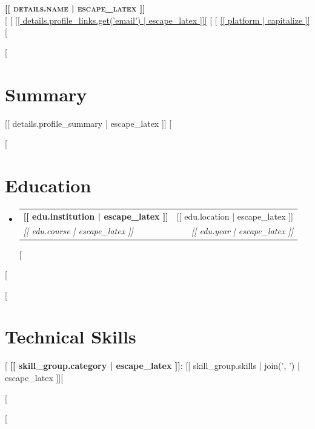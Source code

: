\documentclass[letterpaper,11pt]{article}
\makeatletter
\newcommand{\resumeSubheading}[4]{
  \vspace{-1pt}\item
    \begin{tabular*}{0.97\textwidth}{l@{\extracolsep{\fill}}r}
      \textbf{#1} & #2 \\
      \textit{\small#3} & \textit{\small #4} \\
    \end{tabular*}\vspace{-5pt}
}
\newcommand{\resumeSubHeadingListStart}{\begin{itemize}[leftmargin=*]}
\newcommand{\resumeSubHeadingListEnd}{\end{itemize}}
\makeatother
\begin{document}
\begin{center}
  \textbf{\Huge \scshape [[ details.name | escape_latex ]]} \\ \vspace{1pt}
  \small
  [%
  [%
  \href{mailto:[[ details.profile_links.get('email') ]]}{\underline{[[ details.profile_links.get('email') | escape_latex ]]}}[%
  [%
  [%
  \href{[% if url.startswith('http') %][[ url ]][% else %]https://[[ url ]][% endif %]}{\underline{[[ platform | capitalize ]]}}[%
\end{center}

[%
\section{Summary}
\small [[ details.profile_summary | escape_latex ]]
[%

[%
\section{Education}
  \resumeSubHeadingListStart
    [%
    \resumeSubheading
      {[[ edu.institution | escape_latex ]]}{[[ edu.location | escape_latex ]]}
      {[[ edu.course | escape_latex ]]}{[[ edu.year | escape_latex ]]}
    [%
  \resumeSubHeadingListEnd
[%


[%
\section{Technical Skills}
 \begin{itemize}[leftmargin=0.15in, label={}]
    \small{\item{
    [%
     \textbf{[[ skill_group.category | escape_latex ]]}{: [[ skill_group.skills | join(', ') | escape_latex ]]}[%

    [%
    }}
 \end{itemize}
 \vspace{-16pt}
[%
\end{document}
